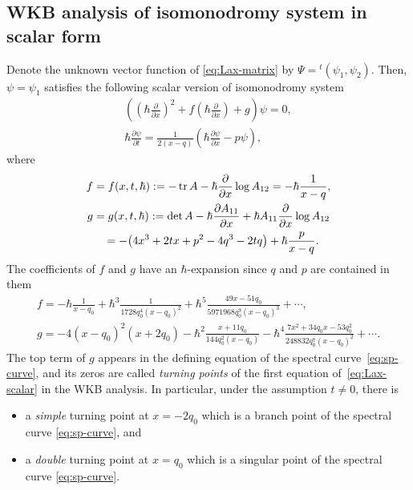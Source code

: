 \documentclass[pdftex]{sigma}
\theoremstyle{definition}
\numberwithin{equation}{section}
\def\p{\partial}
\begin{document}
\subsection{WKB analysis of isomonodromy system in scalar form}
\label{subsection:WKB-for-scalar-Lax}

Denote the unknown vector function of \eqref{eq:Lax-matrix}
by $\Psi = {}^t(\psi_1, \psi_2)$.
Then, $\psi = \psi_1$ satisf\/ies the
following scalar version of isomonodromy system
\begin{gather}
\left( \left(\hbar\frac{\p}{\p x}\right)^{2} +
f \left(\hbar\frac{\p}{\p x}\right) + g \right)\psi = 0, \nonumber\\
\hbar \frac{\p \psi}{\p t} = \frac{1}{2(x-q)} \left(
\hbar \frac{\p \psi}{\p x} - p \psi \right),\label{eq:Lax-scalar}
\end{gather}
where
\begin{gather*}
f = f(x,t,\hbar)   :=   -\operatorname{tr} A - \hbar \frac{\p}{\p x}\log A_{12}
= -\hbar \frac{1}{x-q},  \\
g = g(x,t,\hbar)   :=   \det A - \hbar \frac{\p A_{11}}{\p x} +
\hbar A_{11} \frac{\p}{\p x}\log A_{12}   \\
\hphantom{g}{}
  =
- \big(4x^{3} + 2tx + p^{2} - 4q^{3} - 2tq\big) + \hbar \frac{p}{x-q}.
\end{gather*}
The coef\/f\/icients of $f$ and $g$ have an $\hbar$-expansion since
$q$ and $p$ are contained in them
\begin{gather} \label{eq:hbar-correction-in-quantization}
f   =   - \hbar  \frac{1}{x-q_{0}}
 +\hbar^{3} \frac{1}{1728q_{0}^{4}(x-q_{0})^{2}} + \hbar^{5}
 \frac{49x-51q_{0}}{5971968q_{0}^{9}(x-q_{0})^{3}} + \cdots,
\\  \label{eq:hbar-correction-in-quantization2}
g   =   -4(x-q_{0})^{2}(x+2q_{0})
 - \hbar^{2} \frac{x+11q_{0}}{144q_{0}^{2}(x-q_{0})}
 - \hbar^{4} \frac{7x^{2}+34q_{0}x-53q_{0}^{2}}
  {248832q_{0}^{7}(x-q_{0})^{2}}+\cdots .
\end{gather}
The top term of $g$ appears in the def\/ining equation of
the spectral cur\-ve~\eqref{eq:sp-curve},
and its zeros are called {\em turning points}
of the f\/irst equation of~\eqref{eq:Lax-scalar}
in the WKB analysis.
In particular, under the assumption $t \ne 0$, there is
\begin{itemize}\itemsep=0pt
\item
a {\em simple} turning point at $x=-2q_{0}$
which is a branch point
of the spectral curve \eqref{eq:sp-curve}, and
\item
a {\em double} turning point at $x = q_{0}$
which is a singular point of
the spectral curve \eqref{eq:sp-curve}.
\end{itemize}
\end{document}
